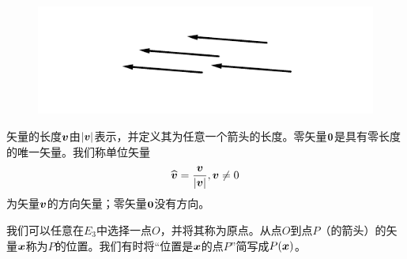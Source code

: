 \begin{figure}[htbp]
	\centering
	\includegraphics[scale=1.3]{./image/1.2.pdf}
	\caption{}
	\label{fig:1.2}
\end{figure}

矢量的长度$\boldsymbol{v}$由$\left| \boldsymbol{v} \right|$表示，并定义其为任意一个箭头的长度。零矢量$\boldsymbol{0}$是具有零长度的唯一矢量。我们称单位矢量
\begin{equation}
    \widehat{\boldsymbol{v}}=\frac{\boldsymbol{v}}{\left| \boldsymbol{v} \right|},\boldsymbol{v}\ne 0
\end{equation}
为矢量$\boldsymbol{v}$的方向矢量；零矢量$\boldsymbol{0}$没有方向。

我们可以任意在$E_3$中选择一点$O$，并将其称为原点。从点$O$到点$P$（的箭头）的矢量$\boldsymbol{x}$称为$P$的位置。我们有时将“位置是$\boldsymbol{x}$的点$P$”简写成$P(\boldsymbol{x})$。